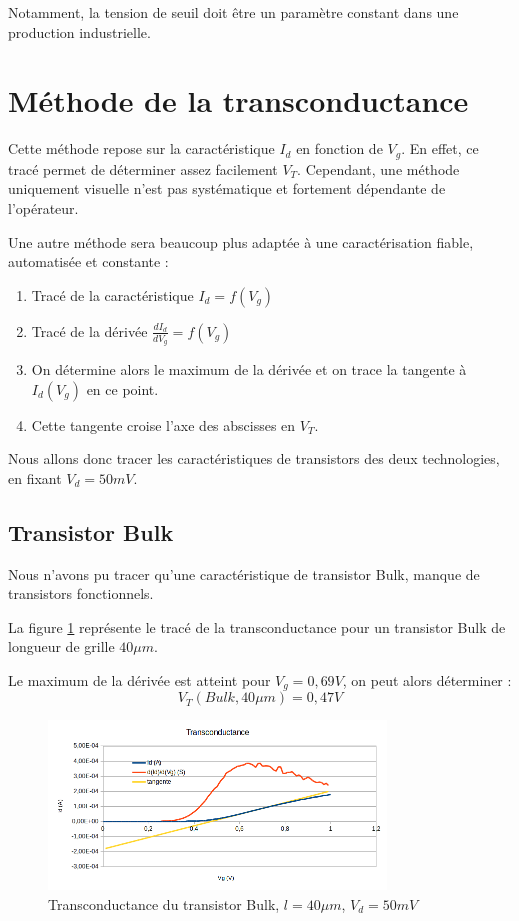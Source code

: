 \documentclass[a4paper,11pt]{report}
\begin{document}
Notamment, la tension de seuil doit être un paramètre constant dans une production industrielle.

\section{Méthode de la transconductance}
Cette méthode repose sur la caractéristique $I_d$ en fonction de $V_g$. En effet, ce tracé permet de déterminer assez facilement $V_T$. Cependant, une méthode uniquement visuelle n'est pas systématique et fortement dépendante de l'opérateur.

Une autre méthode sera beaucoup plus adaptée à une caractérisation fiable, automatisée et constante :
\begin{enumerate}
    \item Tracé de la caractéristique $I_d = f(V_g)$
    \item Tracé de la dérivée $\frac{d I_d}{d V_g} = f(V_g)$
    \item On détermine alors le maximum de la dérivée et on trace la tangente à $I_d(V_g)$ en ce point.
    \item Cette tangente croise l'axe des abscisses en $V_T$.
\end{enumerate}

Nous allons donc tracer les caractéristiques de transistors des deux technologies, en fixant $V_d = 50mV$.

\subsection{Transistor Bulk}
Nous n'avons pu tracer qu'une caractéristique de transistor Bulk, manque de transistors fonctionnels.

La figure \ref{transconductance bulk} représente le tracé de la transconductance pour un transistor Bulk de longueur de grille $40\mu m$.

Le maximum de la dérivée est atteint pour $V_g = 0,69V$, on peut alors déterminer :
\[V_T(Bulk, 40\mu m) = 0,47V
\]

\begin{figure}[h]
    \begin{center}
        \includegraphics[width=0.8\textwidth]{Images/Bulk40-Transconductance}
        \caption{Transconductance du transistor Bulk, $l=40\mu m$, $V_d = 50mV$}
        \label{transconductance bulk}
    \end{center}
\end{figure}
\end{document}
